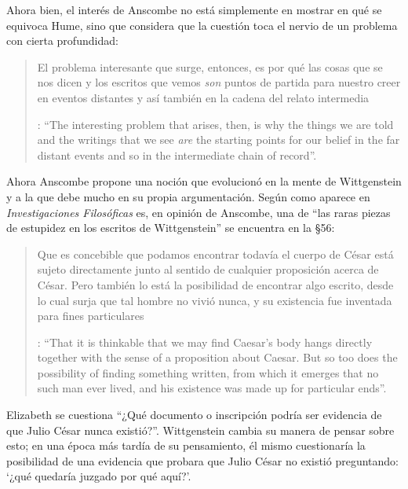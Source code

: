 Ahora bien, el interés de Anscombe no está simplemente en mostrar en qué se equivoca Hume, sino que considera que la cuestión toca el nervio de un problema con cierta profundidad: \blockquote[{\Cite[122]{anscombe2011plato:humecaus}}: \enquote{The interesting problem that arises, then, is why the things we are told and the writings that we see \emph{are} the starting points for our belief in the far distant events and so in the intermediate chain of record}.]{El problema interesante que surge, entonces, es por qué las cosas que se nos dicen y los escritos que vemos \emph{son} puntos de partida para nuestro creer en eventos distantes y así también en la cadena del relato intermedia}.

Ahora Anscombe propone una noción que evolucionó en la mente de Wittgenstein y a la que debe mucho en su propia argumentación. Según como aparece en \emph{Investigaciones Filosóficas} es, en opinión de Anscombe, una de \enquote{las raras piezas de estupidez en los escritos de Wittgenstein} se encuentra en la \S56: \blockquote[{\Cite[89]{anscombe1981parmenides:humeandjulius}}: \enquote{That it is thinkable that we may find Caesar's body hangs directly together with the sense of a proposition about Caesar. But so too does the possibility of finding something written, from which it emerges that no such man ever lived, and his existence was made up for particular ends}.]{Que es concebible que podamos encontrar todavía el cuerpo de César está sujeto directamente junto al sentido de cualquier proposición acerca de César. Pero también lo está la posibilidad de encontrar algo escrito, desde lo cual surja que tal hombre no vivió nunca, y su existencia fue inventada para fines particulares}. Elizabeth se cuestiona \enquote{¿Qué documento o inscripción podría ser evidencia de que Julio César nunca existió?}. Wittgenstein cambia su manera de pensar sobre esto; en una época más tardía de su pensamiento, él mismo cuestionaría la posibilidad de una evidencia que probara que Julio César no existió preguntando: \enquote*{¿qué quedaría juzgado por qué aquí?}.


